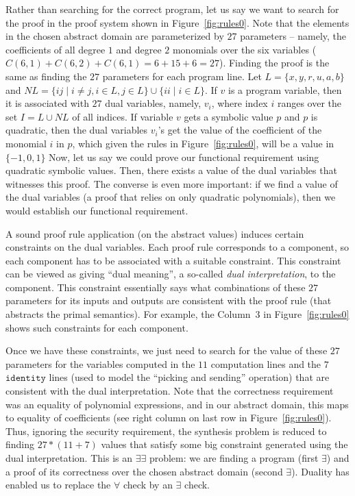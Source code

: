 \documentclass[preprint]{sig-alternate-05-2015}
\begin{document}
Rather than searching for the correct program, let us say we want to
search for the proof in the proof system shown in Figure~\ref{fig:rules0}.  
Note that the
elements in the chosen abstract domain are parameterized
by $27$ parameters -- namely, the coefficients of all degree $1$ and degree $2$
monomials over the six variables ($C(6,1) + C(6,2) + C(6,1) = 6 + 15 + 6 = 27$).
Finding the proof is the same as finding the $27$ parameters for each program
line.
Let $L = \{x,y,r,u,a,b\}$ and $NL = \{ij \mid i\neq j, i\in L, j\in L\}\cup \{ii \mid i\in L\}$.
If $v$ is a program variable, then it is associated with
$27$ dual  variables, namely, $v_i$, where index $i$ ranges over the set
$I = L\cup NL$ of all indices. If variable $v$ gets a symbolic value
$p$ and $p$ is quadratic, then
the dual variables $v_i$'s get the value of the coefficient of the
monomial $i$ in $p$, which given the rules in Figure~\ref{fig:rules0},
will be a value in $\{-1, 0, 1\}$  
Now, let us say we could prove our functional requirement using quadratic
symbolic values.  Then, there exists a value of the dual variables that
witnesses this proof.  The converse is even more important: if
we find a value of the dual variables (a proof that relies on only
quadratic polynomials), then we would establish our functional requirement.

A sound proof rule application (on the abstract values) 
induces certain constraints on the dual variables.
Each proof rule corresponds to a component, so 
each component has to be associated with a suitable
constraint.  This constraint can be viewed as giving
``dual meaning'', a so-called {\em{dual interpretation}},
to the component.  This constraint essentially
says what combinations of these $27$
parameters for its inputs and outputs are consistent with the 
proof rule (that abstracts the primal semantics).
For example, the Column~$3$ in Figure~\ref{fig:rules0} shows
such constraints for each component.

Once we have these constraints, we just need to
search for the value of these $27$ parameters for the 
variables computed in the 
$11$ computation lines and the $7$ $\mathtt{identity}$ lines (used to model
the ``picking and sending'' operation) that are consistent with the
dual interpretation.
Note that the correctness 
requirement was an equality of polynomial expressions, and in our
abstract domain, this maps to equality of coefficients 
(see right column on last row in Figure~\ref{fig:rules0}).
Thus, ignoring the security requirement, 
the synthesis problem is reduced to finding
$27*(11+7)$ values that satisfy some big constraint generated 
using the dual interpretation.  This is an $\exists\exists$ problem:
we are finding a program (first $\exists$) and a proof of its correctness over
the chosen abstract domain (second $\exists$).
Duality has enabled us to replace the $\forall$ check by an 
$\exists$ check.
\end{document}
